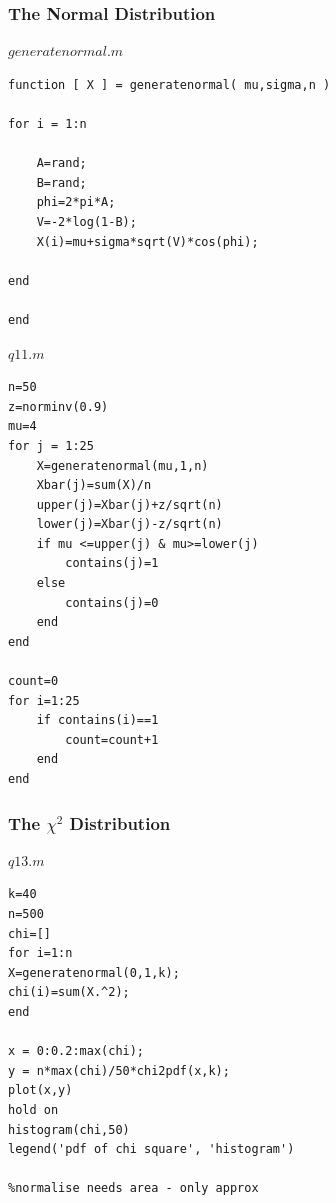 \documentclass[10pt,a4paper]{report}
\begin{document}
\subsubsection*{The Normal Distribution}

$generatenormal.m$

\begin{verbatim}
function [ X ] = generatenormal( mu,sigma,n )

for i = 1:n
    
    A=rand;
    B=rand;
    phi=2*pi*A;
    V=-2*log(1-B);
    X(i)=mu+sigma*sqrt(V)*cos(phi);
    
end

end
\end{verbatim}

\vspace{5mm}

$q11.m$

\begin{verbatim}
n=50
z=norminv(0.9)
mu=4
for j = 1:25   
    X=generatenormal(mu,1,n)
    Xbar(j)=sum(X)/n
    upper(j)=Xbar(j)+z/sqrt(n)
    lower(j)=Xbar(j)-z/sqrt(n)
    if mu <=upper(j) & mu>=lower(j)
        contains(j)=1
    else
        contains(j)=0
    end
end

count=0
for i=1:25
    if contains(i)==1
        count=count+1
    end
end
\end{verbatim}

\subsubsection*{The $\chi^2$ Distribution}

$q13.m$

\begin{verbatim}
k=40
n=500
chi=[]
for i=1:n
X=generatenormal(0,1,k);
chi(i)=sum(X.^2);
end

x = 0:0.2:max(chi);
y = n*max(chi)/50*chi2pdf(x,k);  
plot(x,y)
hold on
histogram(chi,50) 
legend('pdf of chi square', 'histogram')
    
%normalise needs area - only approx
\end{verbatim}

        
        
\end{document}
